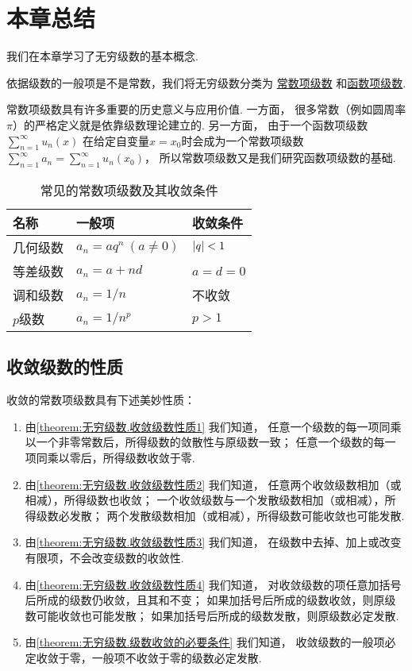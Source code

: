 \section{本章总结}

我们在本章学习了无穷级数的基本概念.

依据级数的一般项是不是常数，我们将无穷级数分类为%
\hyperref[definition:无穷级数.常数项级数的定义]{常数项级数}%
和\hyperref[definition:无穷级数.实函数项级数的概念]{函数项级数}.

常数项级数具有许多重要的历史意义与应用价值.
一方面，
很多常数（例如圆周率\(\pi\)）的严格定义就是依靠级数理论建立的.
另一方面，
由于一个函数项级数\(\sum_{n=1}^\infty u_n(x)\)%
在给定自变量\(x=x_0\)时会成为一个常数项级数\(\sum_{n=1}^\infty a_n
= \sum_{n=1}^\infty u_n(x_0)\)，
所以常数项级数又是我们研究函数项级数的基础.

\begin{table}[h]
	\centering
	\begin{tabular}{*3l}
		\hline
		名称 & 一般项 & 收敛条件 \\ \hline
		几何级数 & \(a_n = a q^n\ (a\neq0)\) & \(\abs{q}<1\) \\
		等差级数 & \(a_n = a + n d\) & \(a = d = 0\) \\
		调和级数 & \(a_n = 1/n\) & 不收敛 \\
		\(p\)级数 & \(a_n = 1/n^p\) & \(p > 1\) \\
		\hline
	\end{tabular}
	\caption{常见的常数项级数及其收敛条件}
\end{table}

\subsection*{收敛级数的性质}
收敛的常数项级数具有下述美妙性质：
\begin{enumerate}
	\item 由\cref{theorem:无穷级数.收敛级数性质1} 我们知道，
	任意一个级数的每一项同乘以一个非零常数后，所得级数的敛散性与原级数一致；
	任意一个级数的每一项同乘以零后，所得级数收敛于零.

	\item 由\cref{theorem:无穷级数.收敛级数性质2} 我们知道，
	任意两个收敛级数相加（或相减），所得级数也收敛；
	一个收敛级数与一个发散级数相加（或相减），所得级数必发散；
	两个发散级数相加（或相减），所得级数可能收敛也可能发散.

	\item 由\cref{theorem:无穷级数.收敛级数性质3} 我们知道，
	在级数中去掉、加上或改变有限项，不会改变级数的收敛性.

	\item 由\cref{theorem:无穷级数.收敛级数性质4} 我们知道，
	对收敛级数的项任意加括号后所成的级数仍收敛，且其和不变；
	如果加括号后所成的级数收敛，则原级数可能收敛也可能发散；
	如果加括号后所成的级数发散，则原级数必定发散.

	\item 由\cref{theorem:无穷级数.级数收敛的必要条件} 我们知道，
	收敛级数的一般项必定收敛于零，一般项不收敛于零的级数必定发散.
\end{enumerate}

